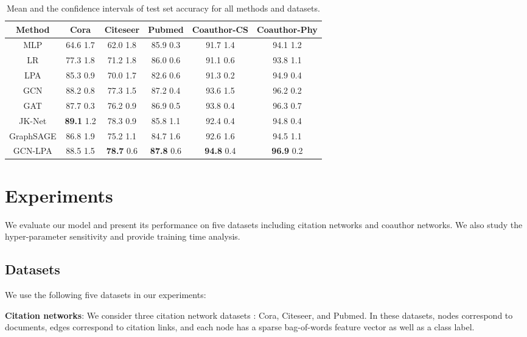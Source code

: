 \documentclass{article}
\begin{document}
		\begin{table*}[t]
			\centering
			\setlength{\tabcolsep}{12pt}
			\begin{tabular}{c|ccccc}
				\hline
				Method & \textbf{Cora} & \textbf{Citeseer} & \textbf{Pubmed} & \textbf{Coauthor-CS} & \textbf{Coauthor-Phy} \\
				\hline
				MLP & 64.6  1.7 & 62.0  1.8 & 85.9  0.3 & 91.7  1.4 & 94.1  1.2 \\
				LR & 77.3  1.8 & 71.2  1.8 & 86.0  0.6 & 91.1  0.6 & 93.8  1.1 \\
				\hline
				LPA & 85.3  0.9 & 70.0  1.7 & 82.6  0.6 & 91.3  0.2 & 94.9  0.4  \\
				\hline
				GCN & 88.2  0.8 & 77.3  1.5 & 87.2  0.4 & 93.6  1.5 & 96.2  0.2 \\
				GAT & 87.7  0.3 & 76.2  0.9 & 86.9  0.5 & 93.8  0.4 & 96.3  0.7 \\
				JK-Net & \textbf{89.1}  1.2 & 78.3  0.9 & 85.8  1.1 & 92.4  0.4 & 94.8  0.4 \\
				GraphSAGE & 86.8  1.9 & 75.2  1.1 & 84.7  1.6 & 92.6  1.6 & 94.5  1.1 \\
				\hline
				GCN-LPA & 88.5  1.5 & \textbf{78.7}  0.6 & \textbf{87.8}  0.6 & \textbf{94.8}  0.4 & \textbf{96.9}  0.2 \\
				\hline
			\end{tabular}
			\caption{Mean and the  confidence intervals of test set accuracy for all methods and datasets.}
			\label{table:random_split}
		\end{table*}

\section{Experiments}
	We evaluate our model and present its performance on five datasets including citation networks and coauthor networks.
	We also study the hyper-parameter sensitivity and provide training time analysis.

	\subsection{Datasets}
		We use the following five datasets in our experiments:
		
		\textbf{Citation networks}:
		We consider three citation network datasets \citep{sen2008collective}:
		Cora, Citeseer, and Pubmed.
		In these datasets, nodes correspond to documents, edges correspond to citation links, and each node has a sparse bag-of-words feature vector as well as a class label.
		
\end{document}
